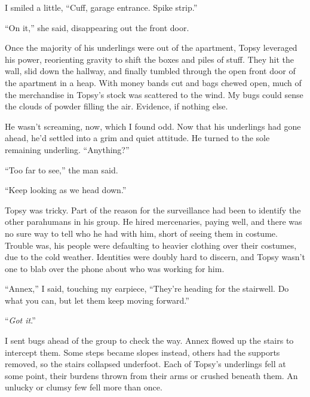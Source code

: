 I smiled a little, ``Cuff, garage entrance.  Spike strip.''



``On it,'' she said, disappearing out the front door.



Once the majority of his underlings were out of the apartment, Topsy leveraged his power, reorienting gravity to shift the boxes and piles of stuff.  They hit the wall, slid down the hallway, and finally tumbled through the open front door of the apartment in a heap.  With money bands cut and bags chewed open, much of the merchandise in Topsy's stock was scattered to the wind.  My bugs could sense the clouds of powder filling the air.  Evidence, if nothing else.



He wasn't screaming, now, which I found odd.  Now that his underlings had gone ahead, he'd settled into a grim and quiet attitude.  He turned to the sole remaining underling.  ``Anything?''



``Too far to see,'' the man said.



``Keep looking as we head down.''



Topsy was tricky.  Part of the reason for the surveillance had been to identify the other parahumans in his group.  He hired mercenaries, paying well, and there was no sure way to tell who he had with him, short of seeing them in costume.  Trouble was, his people were defaulting to heavier clothing over their costumes, due to the cold weather. Identities were doubly hard to discern, and Topsy wasn't one to blab over the phone about who was working for him.



``Annex,'' I said, touching my earpiece, ``They're heading for the stairwell.  Do what you can, but let them keep moving forward.''



``\emph{Got it}.''



I sent bugs ahead of the group to check the way.  Annex flowed up the stairs to intercept them.  Some steps became slopes instead, others had the supports removed, so the stairs collapsed underfoot.  Each of Topsy's underlings fell at some point, their burdens thrown from their arms or crushed beneath them.  An unlucky or clumsy few fell more than once.



